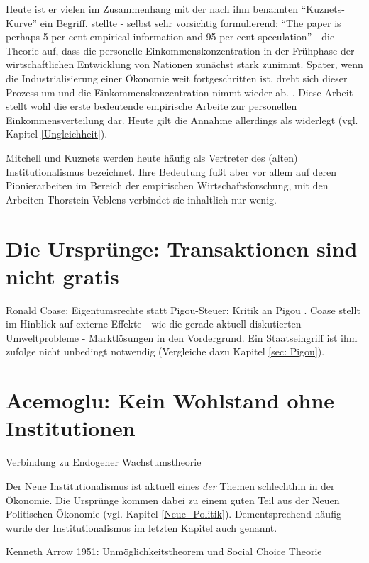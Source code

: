 Heute ist er vielen im Zusammenhang mit der nach ihm benannten "`Kuznets-Kurve"' ein Begriff. \textcite[S. 26]{Kuznets1955} stellte - selbst sehr vorsichtig formulierend: "`The paper is perhaps 5 per cent empirical information and 95 per cent speculation"' - die Theorie auf, dass die personelle Einkommenskonzentration in der Frühphase der wirtschaftlichen Entwicklung von Nationen zunächst stark zunimmt. Später, wenn die Industrialisierung einer Ökonomie weit fortgeschritten ist, dreht sich dieser Prozess um und die Einkommenskonzentration nimmt wieder ab. \parencite{Kuznets1955}. Diese Arbeit stellt wohl die erste bedeutende empirische Arbeite zur personellen Einkommensverteilung dar. Heute gilt die Annahme allerdings als widerlegt (vgl. Kapitel \ref{Ungleichheit}). 

Mitchell und Kuznets werden heute häufig als Vertreter des (alten) Institutionalismus bezeichnet. Ihre Bedeutung fußt aber vor allem auf deren Pionierarbeiten im Bereich der empirischen Wirtschaftsforschung, mit den Arbeiten Thorstein Veblens verbindet sie inhaltlich nur wenig.



\section{Die Ursprünge: Transaktionen sind nicht gratis} \label{sec: Neue Inst}

Ronald Coase: Eigentumsrechte statt Pigou-Steuer: Kritik an Pigou \textcite[S. 243]{Cansier1989}. Coase stellt im Hinblick auf externe Effekte - wie die gerade aktuell diskutierten Umweltprobleme - Marktlösungen in den Vordergrund. Ein Staatseingriff ist ihm zufolge nicht unbedingt notwendig (Vergleiche dazu Kapitel \ref{sec: Pigou}).


\section{Acemoglu: Kein Wohlstand ohne Institutionen}
Verbindung zu Endogener Wachstumstheorie \textcite[S. 633ff]{Snowdon2005}

Der Neue Institutionalismus ist aktuell eines \textit{der} Themen schlechthin in der Ökonomie. Die Ursprünge kommen dabei zu einem guten Teil aus der Neuen Politischen Ökonomie (vgl. Kapitel \ref{Neue_Politik}). Dementsprechend häufig wurde der Institutionalismus im letzten Kapitel auch genannt.

Kenneth Arrow 1951: Unmöglichkeitstheorem und Social Choice Theorie



